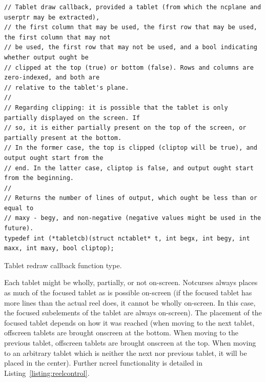 \documentclass[letterpaper,10pt]{article}
\begin{document}
\begin{listing}[!htb]
\begin{verbatim}
// Tablet draw callback, provided a tablet (from which the ncplane and userptr may be extracted),
// the first column that may be used, the first row that may be used, the first column that may not
// be used, the first row that may not be used, and a bool indicating whether output ought be
// clipped at the top (true) or bottom (false). Rows and columns are zero-indexed, and both are
// relative to the tablet's plane.
//
// Regarding clipping: it is possible that the tablet is only partially displayed on the screen. If
// so, it is either partially present on the top of the screen, or partially present at the bottom.
// In the former case, the top is clipped (cliptop will be true), and output ought start from the
// end. In the latter case, cliptop is false, and output ought start from the beginning.
//
// Returns the number of lines of output, which ought be less than or equal to
// maxy - begy, and non-negative (negative values might be used in the future).
typedef int (*tabletcb)(struct nctablet* t, int begx, int begy, int maxx, int maxy, bool cliptop);
\end{verbatim}
\caption{Tablet redraw callback function type.}
\label{list:tabletcb}
\end{listing}

Each tablet might be wholly, partially, or not on-screen. Notcurses always
places as much of the focused tablet as is possible on-screen (if the focused
tablet has more lines than the actual reel does, it cannot be wholly on-screen.
In this case, the focused subelements of the tablet are always on-screen). The
placement of the focused tablet depends on how it was reached (when moving to
the next tablet, offscreen tablets are brought onscreen at the bottom. When
moving to the previous tablet, offscreen tablets are brought onscreen at the
top. When moving to an arbitrary tablet which is neither the next nor previous
tablet, it will be placed in the center). Further ncreel functionality is detailed
in Listing~\ref{listing:reelcontrol}.
\end{document}

